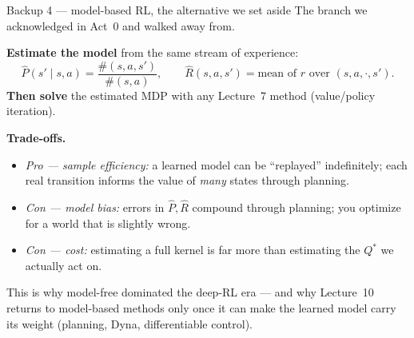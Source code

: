 \documentclass[10pt, aspectratio=169]{beamer}
\begin{document}
\begin{frame}{Backup 4 --- model-based RL, the alternative we set aside}
\footnotesize
The branch we acknowledged in Act~0 and walked away from.
\medskip

\textbf{Estimate the model} from the same stream of experience:
\[
\hat P(s'\mid s,a) = \frac{\#(s,a,s')}{\#(s,a)}, \qquad \hat R(s,a,s') = \text{mean of } r \text{ over } (s,a,\cdot,s').
\]
\textbf{Then solve} the estimated MDP with any Lecture~7 method (value/policy iteration).
\medskip

\textbf{Trade-offs.}
\begin{itemize}\setlength\itemsep{1pt}
\item \emph{Pro --- sample efficiency:} a learned model can be ``replayed'' indefinitely; each real transition informs the value of \emph{many} states through planning.
\item \emph{Con --- model bias:} errors in $\hat P,\hat R$ compound through planning; you optimize for a world that is slightly wrong.
\item \emph{Con --- cost:} estimating a full kernel is far more than estimating the $Q^*$ we actually act on.
\end{itemize}
\medskip
This is why model-free dominated the deep-RL era --- and why Lecture~10 returns to model-based methods only once it can make the learned model carry its weight (planning, Dyna, differentiable control).
\end{frame}
\end{document}
